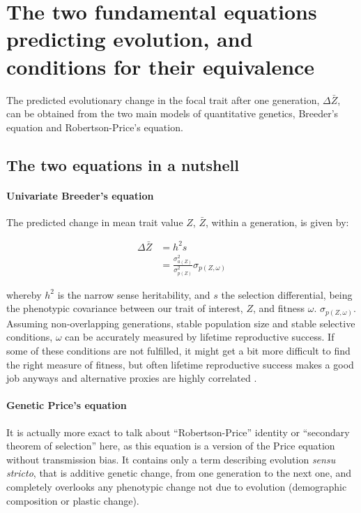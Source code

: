 \section{The two fundamental equations predicting evolution, 
and conditions for their equivalence}
\label{app:mor}
The predicted evolutionary change in the focal trait after one generation, $\Delta \bar{Z}$, can be obtained from the two main models of quantitative genetics, Breeder's equation and Robertson-Price's equation. 

\subsection{The two equations in a nutshell}
\paragraph{Univariate Breeder's equation}

The predicted change in mean trait value $Z$, $\bar{Z}$, within a generation, is given by:

\begin{align}
\Delta \bar{Z} & = h^2 s \\ \label{UVBE} & = \frac{\sigma_{a(Z)}^2}{\sigma_{p(Z)}^2}\sigma_{p(Z,\omega)} %
\end{align}

whereby $h^2$ is the narrow sense heritability, and $s$ the selection differential, being the phenotypic covariance between our trait of interest, $Z$, and fitness $\omega$. $\sigma_{p(Z,\omega)}$. Assuming non-overlapping generations, stable population size and stable selective conditions, $\omega$ can be accurately measured by lifetime reproductive success. If some of these conditions are not fulfilled, it might get a bit more difficult to find the right measure of fitness, but often lifetime reproductive success makes a good job anyways and alternative proxies are highly correlated \citep{Brommer2004}.


\paragraph{Genetic Price's equation}
It is actually more exact to talk about ``Robertson-Price'' identity or ``secondary theorem of selection'' here, as this equation is a version of the Price equation without transmission bias. It contains only a term describing evolution \textit{sensu stricto}, that is additive genetic change, from one generation to the next one, and completely overlooks any phenotypic change not due to evolution (demographic composition or plastic change). 

